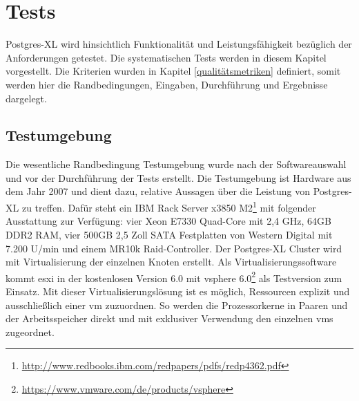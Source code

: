 

\chapter{Tests}
\label{chapter:tests}
Postgres-XL wird hinsichtlich Funktionalität und Leistungsfähigkeit bezüglich der Anforderungen getestet.
Die systematischen Tests werden in diesem Kapitel vorgestellt.
Die Kriterien wurden in Kapitel \ref{qualitätsmetriken} definiert, somit werden hier die Randbedingungen, Eingaben, Durchführung und Ergebnisse dargelegt.

\section{Testumgebung}
Die wesentliche Randbedingung Testumgebung wurde nach der Softwareauswahl und vor der Durchführung der Tests erstellt.
Die Testumgebung ist Hardware aus dem Jahr 2007 und dient dazu, relative Aussagen über die Leistung von Postgres-XL zu treffen.
Dafür steht ein IBM Rack Server x3850 M2\footnote{\url{http://www.redbooks.ibm.com/redpapers/pdfs/redp4362.pdf}} mit folgender Ausstattung zur Verfügung:
vier Xeon E7330 Quad-Core mit 2,4 GHz, 64GB DDR2 RAM, vier 500GB 2,5 Zoll SATA Festplatten von Western Digital mit 7.200 U/min und einem MR10k Raid-Controller.
Der Postgres-XL Cluster wird mit Virtualisierung der einzelnen Knoten erstellt.
Als Virtualisierungssoftware kommt \Gls{esxi} in der kostenlosen Version 6.0 mit \Gls{vsphere} 6.0\footnote{\url{https://www.vmware.com/de/products/vsphere}} als Testversion zum Einsatz.
Mit dieser Virtualisierungslösung ist es möglich, Ressourcen explizit und ausschließlich einer \Gls{vm} zuzuordnen.
So werden die Prozessorkerne in Paaren und der Arbeitsspeicher direkt und mit exklusiver Verwendung den einzelnen \Gls{vm}s zugeordnet.


